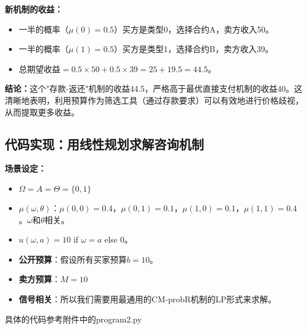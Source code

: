 \textbf{新机制的收益：}
\begin{itemize}
    \item 一半的概率（$\mu(0)=0.5$）买方是类型0，选择合约A，卖方收入50。
    \item 一半的概率（$\mu(1)=0.5$）买方是类型1，选择合约B，卖方收入39。
    \item 总期望收益$= 0.5 \times 50 + 0.5 \times 39 = 25 + 19.5 = 44.5$。
\end{itemize}

\textbf{结论：}这个"存款-返还"机制的收益44.5，严格高于最优直接支付机制的收益40。这清晰地表明，利用预算作为筛选工具（通过存款要求）可以有效地进行价格歧视，从而提取更多收益。

\subsection{代码实现：用线性规划求解咨询机制}

\textbf{场景设定：}
\begin{itemize}
    \item $\Omega=A=\Theta=\{0,1\}$
    \item $\mu(\omega,\theta)$：$\mu(0,0)=0.4$，$\mu(0,1)=0.1$，$\mu(1,0)=0.1$，$\mu(1,1)=0.4$。$\omega$和$\theta$相关。
    \item $u(\omega,a)=10$ if $\omega=a$ else $0$。
    \item \textbf{公开预算}：假设所有买家预算$b = 10$。
    \item \textbf{卖方预算}：$M = 10$
    \item \textbf{信号相关}：所以我们需要用最通用的CM-probR机制的LP形式来求解。
\end{itemize}

具体的代码参考附件中的program2.py

